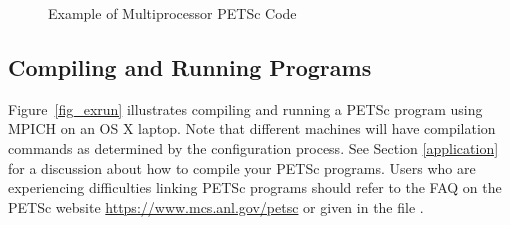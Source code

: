 \begin{figure}[H]
{
  
}
\nobreak
  \caption{Example of Multiprocessor PETSc Code}
\label{fig_example2}
\end{figure}

\subsection*{Compiling and Running Programs}

Figure~\ref{fig_exrun} illustrates compiling and running a PETSc program
using MPICH on an OS X laptop.  Note that different machines will have
compilation commands as determined by the configuration process.  See Section \ref{application}
for a discussion about how to compile your PETSc programs.
Users who are experiencing difficulties linking PETSc programs should
refer to the FAQ on the PETSc website
\href{https://www.mcs.anl.gov/petsc}{https://www.mcs.anl.gov/petsc} or
given in the file .

